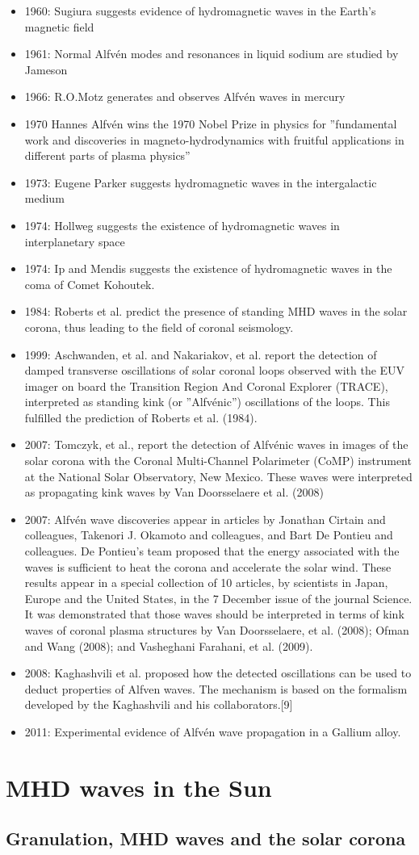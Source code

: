 \documentclass[../main.tex]{subfiles}
\begin{document}
\begin{itemize}
\item 1960: Sugiura suggests evidence of hydromagnetic waves in the Earth's magnetic field
\item 1961: Normal Alfv\'en modes and resonances in liquid sodium are studied by Jameson
\item 1966: R.O.Motz generates and observes Alfv\'en waves in mercury
\item 1970 Hannes Alfv\'en wins the 1970 Nobel Prize in physics for ''fundamental work and discoveries in magneto-hydrodynamics with fruitful applications in different parts of plasma physics''
\item 1973: Eugene Parker suggests hydromagnetic waves in the intergalactic medium
\item 1974: Hollweg suggests the existence of hydromagnetic waves in interplanetary space
\item 1974: Ip and Mendis suggests the existence of hydromagnetic waves in the coma of Comet Kohoutek.
\item 1984: Roberts et al. predict the presence of standing MHD waves in the solar corona, thus leading to the field of coronal seismology.
\item 1999: Aschwanden, et al. and Nakariakov, et al. report the detection of damped transverse oscillations of solar coronal loops observed with the EUV imager on board the Transition Region And Coronal Explorer (TRACE), interpreted as standing kink (or ''Alfv\'enic'') oscillations of the loops. This fulfilled the prediction of Roberts et al. (1984).
\item 2007: Tomczyk, et al., report the detection of Alfv\'enic waves in images of the solar corona with the Coronal Multi-Channel Polarimeter (CoMP) instrument at the National Solar Observatory, New Mexico. These waves were interpreted as propagating kink waves by Van Doorsselaere et al. (2008)
\item 2007: Alfv\'en wave discoveries appear in articles by Jonathan Cirtain and colleagues, Takenori J. Okamoto and colleagues, and Bart De Pontieu and colleagues. De Pontieu's team proposed that the energy associated with the waves is sufficient to heat the corona and accelerate the solar wind. These results appear in a special collection of 10 articles, by scientists in Japan, Europe and the United States, in the 7 December issue of the journal Science. It was demonstrated that those waves should be interpreted in terms of kink waves of coronal plasma structures by Van Doorsselaere, et al. (2008); Ofman and Wang (2008); and Vasheghani Farahani, et al. (2009).
\item 2008: Kaghashvili et al. proposed how the detected oscillations can be used to deduct properties of Alfven waves. The mechanism is based on the formalism developed by the Kaghashvili and his collaborators.[9]
\item 2011: Experimental evidence of Alfvén wave propagation in a Gallium alloy.
\end{itemize}

\chapter{MHD waves in the Sun}
\PartialToc

\section{Granulation, MHD waves and the solar corona}
\cite{alf47granulation}


\stopcontents[chapters]
\end{document}
